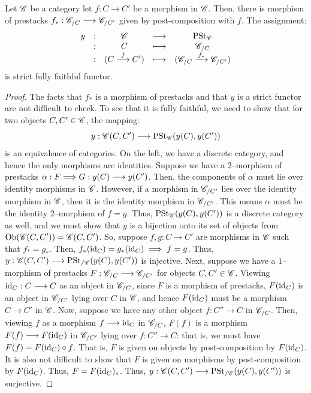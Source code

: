 \documentclass[11pt]{amsart}
\begin{document}
\begin{thm}\label{thm:Yoneda-prest}
Let $\mathscr{C}$ be a category let $f : C \to C'$ be a morphism in $\mathscr{C}$.
Then, there is morphism of prestacks $f_* : \sC_{/C} \to \sC_{/C'}$ given by post-composition
with $f$. The assignment:
\[\begin{array}{ccccc}
y &:& \sC &\to& \PSt_{\sC} \\
  &:& C &\mapsto& \sC_{/C} \\
  &:& (C \to[f] C') &\mapsto& (\sC_{/C} \to[f_*] \sC_{/C'})
\end{array}\]
is strict fully faithful functor.
\end{thm}
\begin{proof}
The facts that $f_*$ is a morphism of prestacks and that $y$ is a strict functor are not difficult
to check. To see that it is fully faithful,
we need to show that for two objects $C, C' \in \mathscr{C}$, the mapping:
\[
y : \sC(C, C') \to \PSt_{\sC}(y(C), y(C'))
\]
is an equivalence of categories. On the left, we have a discrete category,
and hence the only morphisms are identities. Suppose we have a $2$--morphism of prestacks
$\alpha : F \To G : y(C) \to y(C')$. Then, the components of $\alpha$
must lie over identity morphisms in $\mathscr{C}$. However, if a morphism in $\mathscr{C}_{/C'}$ lies
over the identity morphism in $\mathscr{C}$, then it is the identity morphism in $\mathscr{C}_{/C'}$.
This means $\alpha$ must be the identity $2$--morphism of $f = g$. Thus,
$\mathrm{PSt}_{\mathscr{C}}(y(C), y(C'))$ is a discrete category as well, and we must show that $y$ is a bijection
onto its set of objects from $\Ob{\sC(C, C')} = \sC(C, C')$.
So, suppose $f, g : C \to C'$ are morphisms in
$\mathscr{C}$ such that $f_* = g_*$. Then, $f_*(\mathrm{id}_C) = g_*(\mathrm{id}_C) \implies f = g$.
Thus, $y : \sC(C, C') \to \PSt_{/\sC}(y(C), y(C'))$ is injective.
Next, suppose we have a
$1$--morphism of prestacks $F : \sC_{/C} \to \sC_{/C'}$ for objects $C, C' \in \mathscr{C}$.
Viewing $\id_C : C \to C$ as an object in $\mathscr{C}_{/C}$, since $F$ is a morphism of prestacks,
$F(\mathrm{id}_C)$ is an object in $\mathscr{C}_{/C'}$ lying over $C$ in $\mathscr{C}$, and hence $F(\mathrm{id}_C)$ must be
a morphism $C \to C'$ in $\mathscr{C}$. Now, suppose we have any other object $f : C'' \to C$
in $\mathscr{C}_{/C}$. Then, viewing $f$ as a morphism $f \to \id_C$ in $\mathscr{C}_{/C}$,
$F(f)$ is a morphism $F(f) \to F(\id_C)$ in $\mathscr{C}_{/C'}$ lying over $f : C'' \to C$:
that is, we must have $F(f) = F(\mathrm{id}_C) \circ f$. That is, $F$ is given on objects by
post-composition by $F(\mathrm{id}_C)$. It is also not difficult to show that $F$ is given
on morphisms by post-composition by $F(\mathrm{id}_C)$. Thus, $F = F(\mathrm{id}_C)_*$.
Thus, $y : \sC(C, C') \to \PSt_{/\sC}(y(C), y(C'))$ is surjective.
\end{proof}
\end{document}
